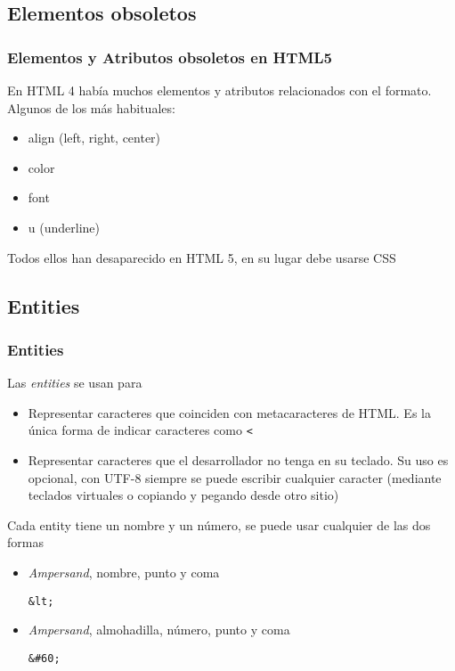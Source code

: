 \documentclass[ucs]{beamer}
\begin{document}
\subsection{Elementos obsoletos}
\begin{frame}[fragile]
\frametitle{Elementos y Atributos obsoletos en HTML5}
En HTML 4 había muchos elementos y atributos relacionados con el formato.
Algunos de los más habituales:
\begin{itemize}
\item
align (left, right, center)

\item
color

\item
font

\item
u  (underline)
\end{itemize}

Todos ellos han desaparecido en HTML 5, en su lugar debe usarse CSS

\end{frame}



\subsection{Entities}
\begin{frame}[fragile]
\frametitle{Entities}
Las 
\emph{entities} se usan para
\begin{itemize}
\item
Representar caracteres que coinciden con metacaracteres de HTML.
Es la única forma de indicar caracteres como
\verb|<|

\item
Representar caracteres que el desarrollador no tenga en su teclado.
Su uso es opcional, con UTF-8 siempre se puede escribir cualquier caracter
(mediante teclados virtuales o copiando y pegando desde otro sitio)
\end{itemize}

Cada entity tiene un nombre y un número, se puede usar cualquier de
las dos formas

    \begin{itemize}
    \item
\emph{Ampersand}, 
nombre, punto y coma

\verb|&lt;|
    \item
\emph{Ampersand}, 
almohadilla, número, punto y coma

\verb|&#60;|

    \end{itemize}

\end{frame}
\end{document}
